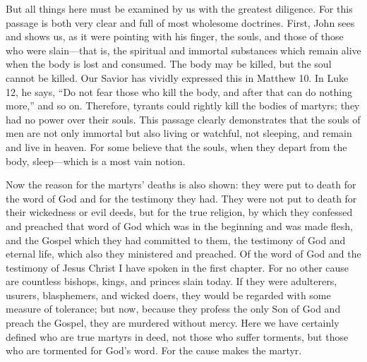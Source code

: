 But all things here must be examined by us with the greatest diligence. For this passage is both very clear and full of most wholesome doctrines. First, John sees and shows us, as it were pointing with his finger, the souls, and those of those who were slain—that is, the spiritual and immortal substances which remain alive when the body is lost and consumed. The body may be killed, but the soul cannot be killed. Our Savior has vividly expressed this in Matthew 10. In Luke 12, he says, “Do not fear those who kill the body, and after that can do nothing more,” and so on. Therefore, tyrants could rightly kill the bodies of martyrs; they had no power over their souls. This passage clearly demonstrates that the souls of men are not only immortal but also living or watchful, not sleeping, and remain and live in heaven. For some believe that the souls, when they depart from the body, sleep—which is a most vain notion.

Now the reason for the martyrs’ deaths is also shown: they were put to death for the word of God and for the testimony they had. They were not put to death for their wickedness or evil deeds, but for the true religion, by which they confessed and preached that word of God which was in the beginning and was made flesh, and the Gospel which they had committed to them, the testimony of God and eternal life, which also they ministered and preached. Of the word of God and the testimony of Jesus Christ I have spoken in the first chapter. For no other cause are countless bishops, kings, and princes slain today. If they were adulterers, usurers, blasphemers, and wicked doers, they would be regarded with some measure of tolerance; but now, because they profess the only Son of God and preach the Gospel, they are murdered without mercy. Here we have certainly defined who are true martyrs in deed, not those who suffer torments, but those who are tormented for God’s word. For the cause makes the martyr.

